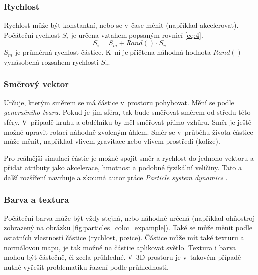 \subsubsection*{Rychlost} Rychlost může být konstantní, nebo se v~čase měnit (například akcelerovat). Počáteční rychlost \(S_i\) je určena vztahem popsaným rovnicí \ref{eq:4}.
\begin{equation}
S_i = S_m + Rand() \cdot S_v
\label{eq:4}
\end{equation}
\(S_m\) je průměrná rychlost částice. K~ní je přičtena náhodná hodnota \(Rand()\) vynásobená rozsahem rychlosti \(S_v\). 
\subsubsection*{Směrový vektor} Určuje, kterým směrem se má částice v~prostoru pohybovat. Mění se podle \emph{generačního tvaru}. Pokud je jím sféra, tak bude směřovat směrem od středu této sféry. V~případě kruhu a obdélníku by měl směřovat přímo vzhůru. Směr je ještě možné upravit rotací náhodně zvoleným úhlem. Směr se v~průběhu života částice může měnit, například vlivem gravitace nebo vlivem prostředí (kolize).

Pro reálnější simulaci částic je možné spojit směr a rychlost do jednoho vektoru a přidat atributy jako akcelerace, hmotnost a podobné fyzikální veličiny. Tato a další rozšíření navrhuje a zkoumá autor práce \emph{Particle system dynamics} \cite{witkin1999particle}. 

\subsubsection*{Barva a textura} Počáteční barva může být vždy stejná, nebo náhodně určená (například ohňostroj zobrazený na obrázku \ref{fig:particles_color_expample}). Také se může měnit podle ostatních vlastností částice (rychlost, pozice). Částice může mít také texturu a normálovou mapu, je tak možné na částice aplikovat světlo. Textura i barva mohou být částečně, či zcela průhledné. V~3D prostoru je v~takovém případě nutné vyřešit problematiku řazení podle průhlednosti.

